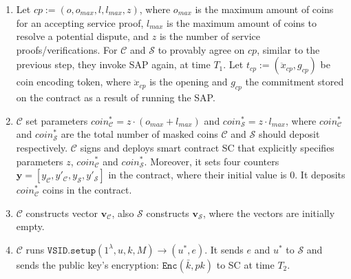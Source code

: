 \begin{enumerate}
\begin{enumerate}
\item Let  $cp:=(o,o_{\scriptscriptstyle max},l,l_{\scriptscriptstyle max},z)$, where $o_{\scriptscriptstyle max}$ is the maximum amount of coins  for an accepting service proof,  $l_{\scriptscriptstyle max}$  is the maximum amount of coins to resolve a potential dispute, and $z$ is the number of  service proofs/verifications. For $\mathcal C$ and $\mathcal S$ to provably agree on $cp$, similar to the previous step, they invoke SAP again, at time $T_{\scriptscriptstyle 1}$.  Let $t_{\scriptscriptstyle cp}:=(\ddot{x}_{\scriptscriptstyle cp},g_{\scriptscriptstyle cp})$ be coin encoding token,  where  $\ddot{x}_{\scriptscriptstyle cp}$ is the opening and $g_{\scriptscriptstyle cp}$ the commitment stored on the contract as a result of running the  SAP. 



\item $\mathcal C$ set parameters  $coin^{\scriptscriptstyle *}_{\scriptscriptstyle\mathcal C}=z\cdot (o_{\scriptscriptstyle max}+l_{\scriptscriptstyle max})$ and $coin^{\scriptscriptstyle *}_{\scriptscriptstyle\mathcal S}=z\cdot l_{\scriptscriptstyle max}$, where $coin^{\scriptscriptstyle *}_{\scriptscriptstyle\mathcal C}$ and $coin^{\scriptscriptstyle *}_{\scriptscriptstyle\mathcal S}$ are   the total number of masked coins $\mathcal C$ and $\mathcal S$ should deposit respectively. $\mathcal C$ signs and deploys  smart contract SC that explicitly specifies  parameters $z$,  $coin^{\scriptscriptstyle *}_{\scriptscriptstyle\mathcal C}$ and $coin^{\scriptscriptstyle *}_{\scriptscriptstyle\mathcal S}$. Moreover, it sets four counters $\bm{y}=[y_{\scriptscriptstyle\mathcal C},y'_{\scriptscriptstyle\mathcal C},y_{\scriptscriptstyle\mathcal S}, y'_{\scriptscriptstyle\mathcal S}]$ in the contract, where their initial value is $0$. It deposits $coin^{\scriptscriptstyle *}_{\scriptscriptstyle\mathcal C}$ coins in the contract.


\item $\mathcal C$ constructs  vector $\bm{v}_{\scriptscriptstyle\mathcal C}$, also $\mathcal S$  constructs $\bm{v}_{\scriptscriptstyle\mathcal S}$,  where the vectors are initially empty. 

\item $\mathcal C$ runs  $\mathtt{VSID.setup}(1^{\lambda}, u,k,M)\rightarrow (u^{\scriptscriptstyle *},e)$.  It sends  $e$ and $u^{\scriptscriptstyle *}$ to $\mathcal S$ and sends  the public key's encryption: $\mathtt{Enc}(\bar{k},pk)$ to SC at time $T_{\scriptscriptstyle 2}$.






\end{enumerate}
\end{enumerate}

